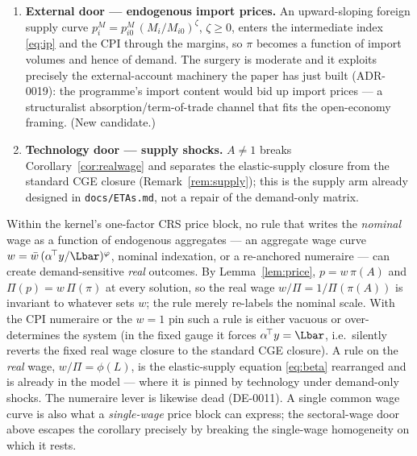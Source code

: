 \begin{enumerate}
      sector-fixed factor with a rental schedule makes marginal cost rise
      in $y_i$ (rents require a rental-income closure --- the largest
      surgery, candidate 3 in \texttt{docs/ETAs.md}). The reduced-form
      variant avoids all income-closure problems: an endogenous utilization
      externality $A^{eff}_i = A_i\,(y_i/\lambda_i)^{-\delta}$ raises unit
      cost with demand while keeping zero profit (the extra cost is paid to
      no one), so a one-line change in the cost hook \eqref{eq:cost}
      suffices. With the opposite sign ($\delta < 0$) it is the
      Kaldor--Verdoorn case: increasing returns make prices \emph{fall}
      with demand --- heterodox-friendly variety in the other direction.
      (New candidate; see Section~\ref{app:eqnumevidence}.)
\item \textbf{External door --- endogenous import prices.} An
      upward-sloping foreign supply curve
      $p^M_i = p^M_{i0}\,(M_i/M_{i0})^{\zeta}$, $\zeta \geq 0$, enters the
      intermediate index \eqref{eq:ip} and the CPI through the margins, so
      $\pi$ becomes a function of import volumes and hence of demand. The
      surgery is moderate and it exploits precisely the external-account
      machinery the paper has just built (ADR-0019): the programme's import
      content would bid up import prices --- a structuralist
      absorption/term-of-trade channel that fits the open-economy framing.
      (New candidate.)
\item \textbf{Technology door --- supply shocks.} $A \neq 1$ breaks
      Corollary~\ref{cor:realwage} and separates the elastic-supply closure
      from the standard CGE closure
      (Remark~\ref{rem:supply}); this is the supply arm already designed in
      \texttt{docs/ETAs.md}, not a repair of the demand-only matrix.
\end{enumerate}

\begin{corollary}\label{cor:nogo}
Within the kernel's one-factor CRS price block, no rule that writes the
\emph{nominal} wage as a function of endogenous aggregates --- an aggregate
wage curve $w = \bar{w}\,(\alpha^{\!\top}y/\Lbar)^{\varphi}$, nominal
indexation, or a re-anchored numeraire --- can create demand-sensitive
\emph{real} outcomes. By Lemma~\ref{lem:price}, $p = w\,\pi(A)$ and
$\Pi(p) = w\,\Pi(\pi)$ at every solution, so the real wage
$w/\Pi = 1/\Pi(\pi(A))$ is invariant to whatever sets $w$; the rule merely
re-labels the nominal scale. With the CPI numeraire or the $w = 1$ pin such
a rule is either vacuous or over-determines the system (in the fixed gauge
it forces $\alpha^{\!\top}y = \Lbar$, i.e.\ silently reverts the fixed real
wage closure to
the standard CGE closure). A rule on the \emph{real} wage,
$w/\Pi = \phi(L)$, is the elastic-supply
equation \eqref{eq:beta} rearranged and is already in the model --- where
it is pinned by technology under demand-only shocks. The numeraire lever is
likewise dead (DE-0011).
A single common wage curve is also what a
\emph{single-wage} price block can express; the sectoral-wage door above
escapes the corollary precisely by breaking the single-wage homogeneity on
which it rests.
\end{corollary}

